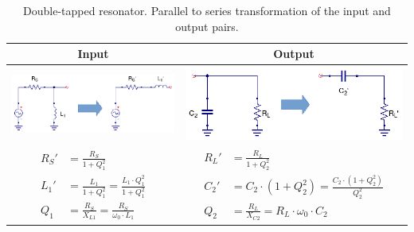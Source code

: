 \begin{table}[H]
  \centering
  \begin{tabular}{ | c | c | }
    \hline
    Input & Output\\ \hline
    \begin{minipage}{.4\textwidth}
      \includegraphics[width=\linewidth]{Double-Tapped-Resonator-p2s-input}
    \end{minipage}
    &
    \begin{minipage}{.4\textwidth}
      \includegraphics[width=\linewidth]{Double-Tapped-Resonator-p2s-output}
    \end{minipage}
\\ \hline
    \begin{minipage}{.4\textwidth}
         {\begin{align}
           R_S' &= \frac{R_S}{1 + Q_1^2}\\
           L_1' &= \frac{L_1}{1 + Q_1^2} = \frac{L_1 \cdot Q_1^2}{1 + Q_1^2}\\
           Q_1 &= \frac{R_S}{X_{L1}} = \frac{R_S}{\omega_0 \cdot L_1}
         \end{align}}
    \end{minipage}
    &
        \begin{minipage}{.4\textwidth}
         {\begin{align}
           R_L' &= \frac{R_L}{1 + Q_2^2}\\
           C_2' &= C_2 \cdot (1 + Q_2^2) = \frac{C_2 \cdot (1 + Q_2^2)}{Q_2^2}\\
           Q_2 &= \frac{R_L}{X_{C2}} = R_L \cdot \omega_0 \cdot C_2
         \end{align}}
    \end{minipage}
    \\ \hline
  \end{tabular}
  \caption{Double-tapped resonator. Parallel to series transformation of the input and output pairs.}
  \label{tbl:tee-matching}
\end{table}
 
